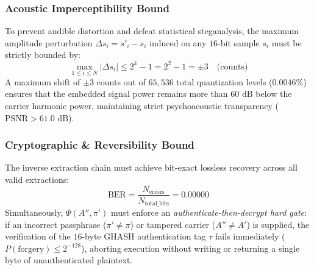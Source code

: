 \documentclass[10pt,conference]{IEEEtran}
\begin{document}
\subsubsection{Acoustic Imperceptibility Bound}
To prevent audible distortion and defeat statistical steganalysis, the maximum amplitude perturbation $\Delta s_i = s'_i - s_i$ induced on any $16$-bit sample $s_i$ must be strictly bounded by:
\begin{equation}
\max_{1 \le i \le N} |\Delta s_i| \le 2^k - 1 = 2^2 - 1 = \pm 3 \quad \text{(counts)}
\label{eq:imperceptibility}
\end{equation}
A maximum shift of $\pm 3$ counts out of $65,536$ total quantization levels ($0.0046\%$) ensures that the embedded signal power remains more than $60\text{ dB}$ below the carrier harmonic power, maintaining strict psychoacoustic transparency ($\text{PSNR} > 61.0\text{ dB}$).

\subsubsection{Cryptographic & Reversibility Bound}
The inverse extraction chain must achieve bit-exact lossless recovery across all valid extractions:
\begin{equation}
\text{BER} = \frac{N_{\text{errors}}}{N_{\text{total\_bits}}} = 0.00000
\label{eq:ber}
\end{equation}
Simultaneously, $\Psi(A'', \pi')$ must enforce an \textit{authenticate-then-decrypt hard gate}: if an incorrect passphrase ($\pi' \ne \pi$) or tampered carrier ($A'' \ne A'$) is supplied, the verification of the $16$-byte GHASH authentication tag $\tau$ fails immediately ($P(\text{forgery}) \le 2^{-128}$), aborting execution without writing or returning a single byte of unauthenticated plaintext.
\end{document}
